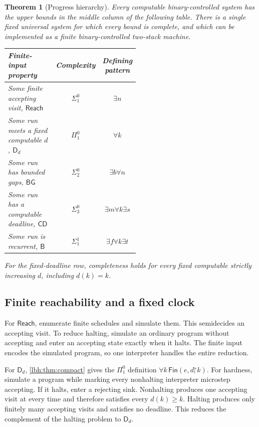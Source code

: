 \documentclass[11pt,letterpaper]{article}
\newtheorem{theorem}{Theorem}[section]
\theoremstyle{definition}
\theoremstyle{remark}
\newcommand{\sig}[1]{\Sigma^{0}_{#1}}
\newcommand{\ppi}[1]{\Pi^{0}_{#1}}
\newcommand{\an}{\Sigma^{1}_{1}}
\newcommand{\Buchi}{\mathsf{B}}
\newcommand{\Clock}{\mathsf{CD}}
\newcommand{\Gap}{\mathsf{BG}}
\newcommand{\Fixed}{\mathsf{D}}
\newcommand{\Reach}{\mathsf{Reach}}
\newcommand{\Fin}{\mathsf{Fin}}
\newcommand{\pref}{\mathord{\upharpoonright}}
\newcommand{\1}{\mathbf 1}
\begin{document}
\begin{theorem}[Progress hierarchy]\label{lbh:thm:hierarchy}
Every computable binary-controlled system has the upper bounds in the middle
column of the following table. There is a single fixed universal system for
which every bound is complete, and which can be implemented as a finite
binary-controlled two-stack machine.
\begin{center}
\begin{tabular}{@{}p{0.52\linewidth}cc@{}}
\toprule
Finite-input property & Complexity & Defining pattern\\
\midrule
Some finite accepting visit, $\Reach$ & $\sig1$ & $\exists n$\\
Some run meets a fixed computable $d$, $\Fixed_d$ & $\ppi1$ & $\forall k$\\
Some run has bounded gaps, $\Gap$ & $\sig2$ & $\exists b\forall n$\\
Some run has a computable deadline, $\Clock$ & $\sig3$ & $\exists m\forall k\exists s$\\
Some run is recurrent, $\Buchi$ & $\an$ & $\exists f\forall k\exists t$\\
\bottomrule
\end{tabular}
\end{center}
For the fixed-deadline row, completeness holds for every fixed computable
strictly increasing $d$, including $d(k)=k$.
\end{theorem}

\subsection{Finite reachability and a fixed clock}
For $\Reach$, enumerate finite schedules and simulate them. This semidecides
an accepting visit. To reduce halting, simulate an ordinary program without
accepting and enter an accepting state exactly when it halts. The finite
input encodes the simulated program, so one interpreter handles the entire
reduction.

For $\Fixed_d$, \cref{lbh:thm:compact} gives the $\ppi1$ definition
$\forall k\,\Fin(e,d\pref k)$. For hardness, simulate a program while
marking every nonhalting interpreter microstep accepting. If it halts,
enter a rejecting sink. Nonhalting produces one accepting visit at every
time and therefore satisfies every $d(k)\ge k$. Halting produces only
finitely many accepting visits and satisfies no deadline. This reduces
the complement of the halting problem to $\Fixed_d$.
\end{document}
